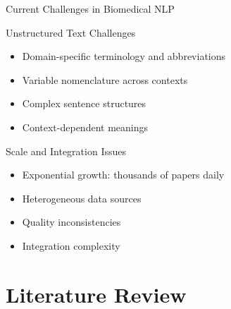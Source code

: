 \documentclass[aspectratio=169, 11pt]{beamer}
\begin{document}
\begin{frame}{Current Challenges in Biomedical NLP}
    \vspace{0.3cm}
    \begin{block}{Unstructured Text Challenges}
        \begin{itemize}
            \setlength{\itemsep}{0.3cm}
            \item Domain-specific terminology and abbreviations
            \item Variable nomenclature across contexts
            \item Complex sentence structures
            \item Context-dependent meanings
        \end{itemize}
    \end{block}
    
    \vspace{0.4cm}
    \begin{block}{Scale and Integration Issues}
        \begin{itemize}
            \setlength{\itemsep}{0.3cm}
            \item Exponential growth: thousands of papers daily
            \item Heterogeneous data sources
            \item Quality inconsistencies
            \item Integration complexity
        \end{itemize}
    \end{block}
\end{frame}

\section{Literature Review}
\end{document}
